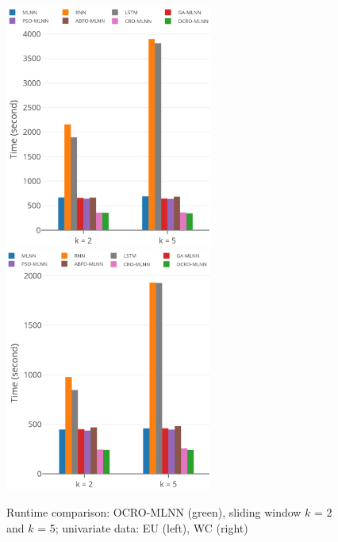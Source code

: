 \documentclass[smallcondensed, natbib]{svjour3}     %
\begin{document}
{\begin{figure}
	\centering
	\begin{minipage}[t]{1.0\textwidth}
		\centering
		\includegraphics[width=0.45\textwidth =0cm 0cm 0cm 0cm, height = 8cm]{time/time_eu.pdf}
		\centering
		\includegraphics[width=0.45\textwidth =0cm 0cm 0cm 0cm, height = 8cm]{time/time_wc.pdf}
	\end{minipage}
	\caption{Runtime comparison: OCRO-MLNN (green), sliding window $k$ = 2 and $k$ = 5; univariate data: EU (left), WC (right)} 
	\label{fig:speed_system_univariate}
\end{figure}

}
\end{document}
